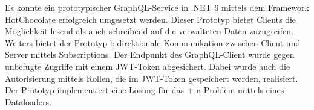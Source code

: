 Es konnte ein prototypischer GraphQL-Service in .NET 6 mittels dem Framework HotChocolate erfolgreich umgesetzt werden.
Dieser Prototyp bietet Clients die Möglichkeit lesend als auch schreibend auf die verwalteten Daten zuzugreifen.
Weiters bietet der Prototyp bidirektionale Kommunikation zwischen Client und Server mittels Subscriptions.
Der Endpunkt des GraphQL-Client wurde gegen unbefugte Zugriffe mit einem JWT-Token abgesichert.
Dabei wurde auch die Autorisierung mittels Rollen, die im JWT-Token gespeichert werden, realisiert.
Der Prototyp implementiert eine Lösung für das  + n Problem\grqq{} mittels eines Dataloaders.